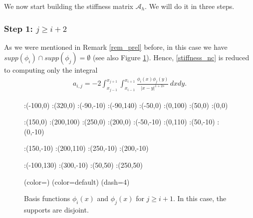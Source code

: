 We now start building the stiffness matrix $\mathcal A_h$. We will do it in three steps.

\subsubsection*{Step 1: $j\geq i+2$}
As we were mentioned in Remark \ref{rem_prel} before, in this case we have $supp(\phi_i)\cap supp(\phi_j) =\emptyset$ (see also Figure \ref{basis_upp_tri}). Hence, \eqref{stiffness_nc} is reduced to computing only the integral
\begin{align}\label{elem_noint}
	a_{i,j}=-2 \int_{x_{j-1}}^{x_{j+1}}\int_{x_{i-1}}^{x_{i+1}}\frac{\phi_i(x)\phi_j(y)}{|x-y|^{1+2s}}\,dxdy.
\end{align}

\begin{figure}[h]
\figinit{0.8pt}
:(-100,0) :(320,0)
:(-90,-10) :(-90,140)
:(-50,0) :(0,100) 
:(50,0) :(0,0)

:(150,0) :(200,100) 
:(250,0) :(200,0)
%
:(-50,-10) :(0,110) 
:(50,-10) :(0,-10)

:(150,-10) :(200,110) 
:(250,-10) :(200,-10)

:(-100,130) :(300,-10)
:(50,50) :(250,50)

\figdrawbegin{}
\figdrawarrow[1,2]
\figdrawline[3,4]
\figdrawline[4,5]
\figset (color=\Redrgb)
\figdrawline[31,41]
\figdrawline[41,51]
\figset (color=default)
\figset(dash=4)
\figdrawline[4,6]
\figdrawline[41,61]
\figdrawarrow[11,12]

\figdrawend

\centerline{\box\figBoxA}
\caption{Basis functions $\phi_i(x)$ and $\phi_j(x)$ for $j\geq i+1$. In this case, the supports are disjoint.}\label{basis_upp_tri}
\end{figure}

